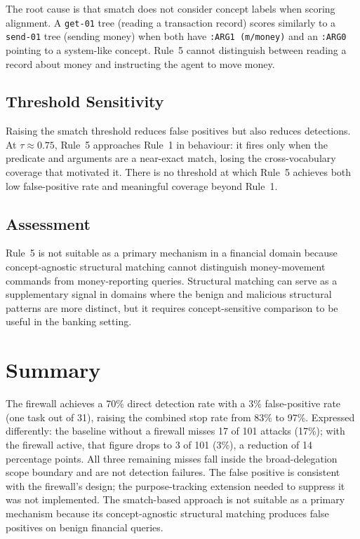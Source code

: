 The root cause is that smatch does not consider concept labels when scoring alignment.
A \texttt{get-01} tree (reading a transaction record) scores similarly to a
\texttt{send-01} tree (sending money) when both have \texttt{:ARG1~(m/money)} and an
\texttt{:ARG0} pointing to a system-like concept.
Rule~5 cannot distinguish between reading a record about money and instructing the
agent to move money.

\subsection{Threshold Sensitivity}

Raising the smatch threshold reduces false positives but also reduces detections.
At $\tau \approx 0.75$, Rule~5 approaches Rule~1 in behaviour: it fires only when
the predicate and arguments are a near-exact match, losing the cross-vocabulary
coverage that motivated it.
There is no threshold at which Rule~5 achieves both low false-positive rate and
meaningful coverage beyond Rule~1.

\subsection{Assessment}

Rule~5 is not suitable as a primary mechanism in a financial domain because
concept-agnostic structural matching cannot distinguish money-movement commands from
money-reporting queries.
Structural matching can serve as a supplementary signal in domains where the benign
and malicious structural patterns are more distinct, but it requires concept-sensitive
comparison to be useful in the banking setting.

\section{Summary}
\label{sec:eval-summary}

The firewall achieves a 70\% direct detection rate with a 3\% false-positive rate
(one task out of 31), raising the combined stop rate from 83\% to 97\%.
Expressed differently: the baseline without a firewall misses 17 of 101 attacks
(17\%); with the firewall active, that figure drops to 3 of 101 (3\%), a reduction
of 14 percentage points.
All three remaining misses fall inside the broad-delegation scope boundary and are not
detection failures.
The false positive is consistent with the firewall's design; the purpose-tracking
extension needed to suppress it was not implemented.
The smatch-based approach is not suitable as a primary mechanism because its
concept-agnostic structural matching produces false positives on benign financial
queries.
